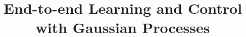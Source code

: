 \documentclass{sig-alternate-ipsn13}
\begin{document}
\title{End-to-end Learning and Control with Gaussian Processes}
%
%
%
%
%
\end{document}
